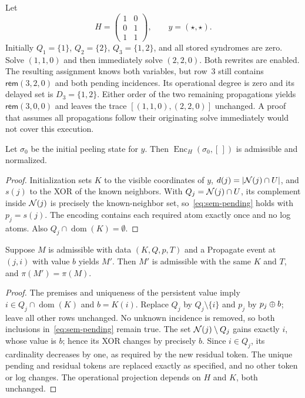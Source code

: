 \begin{exa}
\label{exa:sem-interleaving}
Let
\[
 H=\begin{pmatrix}1&0\\0&1\\1&1\end{pmatrix},
 \qquad y=(\star,\star).
\]
Initially $Q_1=\{1\}$, $Q_2=\{2\}$, $Q_3=\{1,2\}$, and all stored
syndromes are zero. Solve $(1,1,0)$ and then immediately solve $(2,2,0)$.
Both rewrites are enabled. The resulting assignment knows both variables,
but row~3 still contains $\mathsf{rem}(3,2,0)$ and both pending incidences.
Its operational degree is zero and its delayed set is $D_3=\{1,2\}$.
Either order of the two remaining propagations yields
$\mathsf{rem}(3,0,0)$ and leaves the trace
$[(1,1,0),(2,2,0)]$ unchanged. A proof that assumes all propagations follow
their originating solve immediately would not cover this execution.
\end{exa}

\begin{lem}[Initialization]
\label{lem:sem-init}
Let $\sigma_0$ be the initial peeling state for $y$. Then
$\operatorname{Enc}_H(\sigma_0,[\,])$ is admissible and normalized.
\end{lem}
\begin{proof}
Initialization sets $K$ to the visible coordinates of $y$,
$d(j)=|\mathcal{N}(j)\cap U|$, and $s(j)$ to the XOR of the known neighbors.
With $Q_j=\mathcal{N}(j)\cap U$, its complement inside $\mathcal{N}(j)$ is precisely the
known-neighbor set, so~\eqref{eq:sem-pending} holds with $p_j=s(j)$.
The encoding contains each required atom exactly once and no log atoms.
Also $Q_j\cap\operatorname{dom}(K)=\emptyset$.
\end{proof}

\begin{lem}
\label{lem:sem-propagate}
Suppose $M$ is admissible with data $(K,Q,p,T)$ and a Propagate event at
$(j,i)$ with value $b$ yields $M'$. Then $M'$ is admissible with the same
$K$ and $T$, and $\pi(M')=\pi(M)$.
\end{lem}
\begin{proof}
The premises and uniqueness of the persistent value imply
$i\in Q_j\cap\operatorname{dom}(K)$ and $b=K(i)$. Replace $Q_j$ by
$Q_j\setminus\{i\}$ and $p_j$ by $p_j\oplus b$; leave all other rows unchanged.
No unknown incidence is removed, so both inclusions
in~\eqref{eq:sem-pending} remain true. The set
$\mathcal{N}(j)\setminus Q_j$ gains exactly $i$, whose value is $b$; hence its XOR
changes by precisely $b$. Since $i\in Q_j$, its cardinality decreases by
one, as required by the new residual token. The unique pending and residual
tokens are replaced exactly as specified, and no other token or log changes.
The operational projection depends on $H$ and $K$, both unchanged.
\end{proof}

